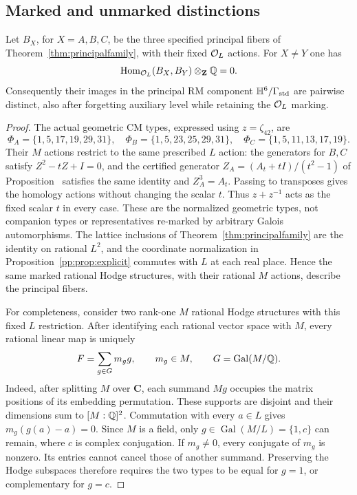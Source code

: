 \subsection{Marked and unmarked distinctions}
\begin{proposition}
\label{pp:prop:markeddistinct}
Let $B_X$, for $X=A,B,C$, be the three specified principal fibers of
Theorem~\ref{thm:principalfamily}, with their fixed $\mathcal O_L$ actions.
For $X\ne Y$ one has
\[
 \operatorname{Hom}_{\mathcal O_L}(B_X,B_Y)\otimes_{\mathbf Z}\mathbb Q=0.
\]
Consequently their images in the principal RM component
$\mathbb H^6/\Gamma_{\rm std}$ are pairwise distinct, also after forgetting
auxiliary level while retaining the $\mathcal O_L$ marking.
\end{proposition}
\begin{proof}
The actual geometric CM types, expressed using $z=\zeta_{42}$, are
\[
 \Phi_A=\{1,5,17,19,29,31\},\quad
 \Phi_B=\{1,5,23,25,29,31\},\quad
 \Phi_C=\{1,5,11,13,17,19\}.
\]
Their $M$ actions restrict to the same prescribed $L$ action:
the generators for $B,C$ satisfy $Z^2-tZ+I=0$, and the certified
generator $Z_A=(A_t+tI)/(t^2-1)$ of
Proposition~ satisfies the same identity and
$Z_A^3=A_t$. Passing to transposes gives the homology actions without
changing the scalar $t$. Thus $z+z^{-1}$ acts as the fixed scalar $t$
in every case. These are the normalized geometric types, not companion types
or representatives re-marked by arbitrary Galois automorphisms.
The lattice inclusions of Theorem~\ref{thm:principalfamily} are the
identity on rational $L^2$, and the coordinate normalization in
Proposition~\ref{pp:prop:explicit} commutes with $L$ at each real
place. Hence the same marked rational Hodge structures, with their
rational $M$ actions, describe the principal fibers.

For completeness, consider two rank-one $M$ rational Hodge structures
with this fixed $L$ restriction. After identifying each rational
vector space with $M$, every rational linear map is uniquely
\[
 F=\sum_{g\in G}m_g g,\qquad m_g\in M,\qquad
 G=\operatorname{Gal}(M/\mathbb Q).
\]
Indeed, after splitting $M$ over $\mathbf C$, each summand $Mg$
occupies the matrix positions of its embedding permutation. These
supports are disjoint and their dimensions sum to $[M:\mathbb Q]^2$.
Commutation with every $a\in L$ gives
$m_g(g(a)-a)=0$. Since $M$ is a field, only
$g\in\operatorname{Gal}(M/L)=\{1,c\}$ can remain, where $c$ is
complex conjugation. If $m_g\ne0$, every conjugate of $m_g$ is
nonzero. Its entries cannot cancel those of another summand.
Preserving the Hodge subspaces therefore requires the two types to
be equal for $g=1$, or complementary for $g=c$.


\end{proof}
